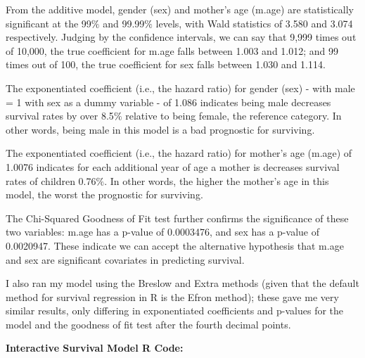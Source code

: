 \documentclass[12pt,letterpaper]{article}
\begin{document}
    \noindent From the additive model, gender (sex) and mother's age (m.age) are statistically significant at the 99$\%$ and 99.99$\%$ levels, with Wald statistics of 3.580 and 3.074 respectively. Judging by the confidence intervals, we can say that 9,999 times out of 10,000, the true coefficient for m.age falls between 1.003 and 1.012; and 99 times out of 100, the true coefficient for sex falls between 1.030 and 1.114.

\vspace{.25cm}
    
    \noindent The exponentiated coefficient (i.e., the hazard ratio) for gender (sex) - with male = 1 with sex as a dummy variable - of 1.086 indicates being male decreases survival rates by over 8.5$\%$ relative to being female, the reference category. In other words, being male in this model is a bad prognostic for surviving.

\vspace{.25cm}

    \noindent The exponentiated coefficient (i.e., the hazard ratio) for mother's age (m.age) of 1.0076 indicates for each additional year of age a mother is decreases survival rates of children 0.76$\%$. In other words, the higher the mother's age in this model, the worst the prognostic for surviving.

\vspace{.25cm}

    \noindent The Chi-Squared Goodness of Fit test further confirms the significance of these two variables: m.age has a p-value of 0.0003476, and sex has a p-value of 0.0020947. These indicate we can accept the alternative hypothesis that m.age and sex are significant covariates in predicting survival.

\vspace{.25cm}

    I also ran my model using the Breslow and Extra methods (given that the default method for survival regression in R is the Efron method); these gave me very similar results, only differing in exponentiated coefficients and p-values for the model and the goodness of fit test after the fourth decimal points.
    
\vspace{.65cm} 

\textbf{Interactive Survival Model R Code:}
\end{document}
